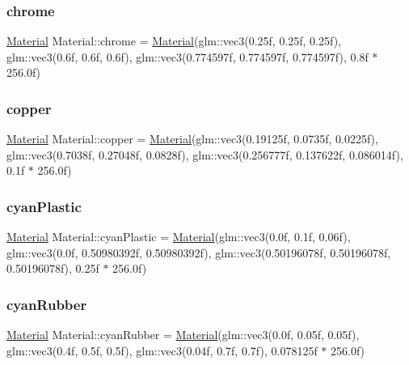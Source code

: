 \subsubsection{\texorpdfstring{chrome}{chrome}}
{\footnotesize\ttfamily \mbox{\hyperlink{struct_material}{Material}} Material\+::chrome = \mbox{\hyperlink{struct_material}{Material}}(glm\+::vec3(0.\+25f, 0.\+25f, 0.\+25f), glm\+::vec3(0.\+6f, 0.\+6f, 0.\+6f), glm\+::vec3(0.\+774597f, 0.\+774597f, 0.\+774597f), 0.\+8f $\ast$ 256.\+0f)\hspace{0.3cm}{\ttfamily [static]}}

\mbox{\label{struct_material_aad09f525699803a4ed3e7cd6afd3f8a5}} 
\subsubsection{\texorpdfstring{copper}{copper}}
{\footnotesize\ttfamily \mbox{\hyperlink{struct_material}{Material}} Material\+::copper = \mbox{\hyperlink{struct_material}{Material}}(glm\+::vec3(0.\+19125f, 0.\+0735f, 0.\+0225f), glm\+::vec3(0.\+7038f, 0.\+27048f, 0.\+0828f), glm\+::vec3(0.\+256777f, 0.\+137622f, 0.\+086014f), 0.\+1f $\ast$ 256.\+0f)\hspace{0.3cm}{\ttfamily [static]}}

\mbox{\label{struct_material_a24c31c15d55457a83429418bb8745e03}} 
\subsubsection{\texorpdfstring{cyanPlastic}{cyanPlastic}}
{\footnotesize\ttfamily \mbox{\hyperlink{struct_material}{Material}} Material\+::cyan\+Plastic = \mbox{\hyperlink{struct_material}{Material}}(glm\+::vec3(0.\+0f, 0.\+1f, 0.\+06f), glm\+::vec3(0.\+0f, 0.\+50980392f, 0.\+50980392f), glm\+::vec3(0.\+50196078f, 0.\+50196078f, 0.\+50196078f), 0.\+25f $\ast$ 256.\+0f)\hspace{0.3cm}{\ttfamily [static]}}

\mbox{\label{struct_material_a75c93c67433d5aafd1ed76aef97950a2}} 
\subsubsection{\texorpdfstring{cyanRubber}{cyanRubber}}
{\footnotesize\ttfamily \mbox{\hyperlink{struct_material}{Material}} Material\+::cyan\+Rubber = \mbox{\hyperlink{struct_material}{Material}}(glm\+::vec3(0.\+0f, 0.\+05f, 0.\+05f), glm\+::vec3(0.\+4f, 0.\+5f, 0.\+5f), glm\+::vec3(0.\+04f, 0.\+7f, 0.\+7f), 0.\+078125f $\ast$ 256.\+0f)\hspace{0.3cm}{\ttfamily [static]}}

